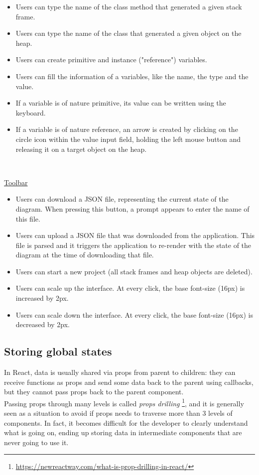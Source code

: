 \documentclass[]{usiinfbachelorproject}
\begin{document}
\begin{itemize}
	\item Users can type the name of the class method that generated a given stack frame.
	\item Users can type the name of the class that generated a given object on the heap.
	\item Users can create primitive and instance ("reference") variables.
	\item Users can fill the information of a variables, like the name, the type and the value.
	\item If a variable is of nature primitive, its value can be written using the keyboard.
	\item If a variable is of nature reference, an arrow is created by clicking on the circle icon within the value input field, holding the left mouse button and releasing it on a target object on the heap.
\end{itemize}\

\vspace{\fill}
\pagebreak

\ul{Toolbar}

\begin{itemize}
	\item Users can download a JSON file, representing the current state of the diagram. When pressing this button, a prompt appears to enter the name of this file.
	\item Users can upload a JSON file that was downloaded from the application. This file is parsed and it triggers the application to re-render with the state of the diagram at the time of downloading that file.
	\item Users can start a new project (all stack frames and heap objects are deleted).
	\item Users can scale up the interface. At every click, the base font-size (16px) is increased by 2px.
	\item Users can scale down the interface. At every click, the base font-size (16px) is decreased by 2px.
\end{itemize}

\subsection{Storing global states} \label{storing states}

In React, data is usually shared via props from parent to children: they can receive functions as props and send some data back to the parent using callbacks, but they cannot pass props back to the parent component.\\ Passing props through many levels is called \emph{props drilling} \footnote{\url{https://newreactway.com/what-is-prop-drilling-in-react/}}, and it is generally seen as a situation to avoid if props needs to traverse more than 3 levels of components. In fact, it becomes difficult for the developer to clearly understand what is going on, ending up storing data in intermediate components that are never going to use it.\\
\end{document}
